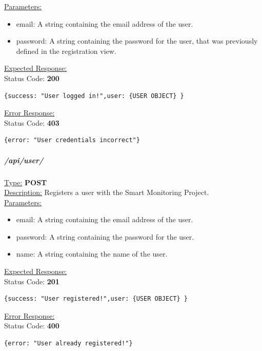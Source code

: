 \documentclass[preprint,12pt,3p]{elsarticle}
\newcommand{\forceindent}{\leavevmode{\parindent=1em\indent}}
\begin{document}
\underline{Parameters:}
\begin{itemize}
\item email: A string containing the email address of the user.

\item password: A string containing the password for the user, that was previously defined in the registration view.

\end{itemize}

\underline{Expected Response:}\\[5pt]
\forceindent Status Code: \textbf{200} \\
\begin{verbatim}
{success: "User logged in!",user: {USER OBJECT} }
\end{verbatim}
\underline{Error Response:}\\[5pt]
\forceindent Status Code: \textbf{403} \\
\begin{verbatim}
{error: "User credentials incorrect"}
\end{verbatim}


\subparagraph*{/api/user/}


\underline{Type:} \textbf{POST}\\

\underline{Description:} Registers a user with the Smart Monitoring Project.\\

\underline{Parameters:}
\begin{itemize}
\item email: A string containing the email address of the user.

\item password: A string containing the password for the user.

\item name: A string containing the name of the user.

\end{itemize}

\underline{Expected Response:}\\[5pt]
\forceindent Status Code: \textbf{201} \\
\begin{verbatim}
{success: "User registered!",user: {USER OBJECT} }
\end{verbatim}
\underline{Error Response:}\\[5pt]
\forceindent Status Code: \textbf{400} \\
\begin{verbatim}
{error: "User already registered!"}
\end{verbatim}
\end{document}

